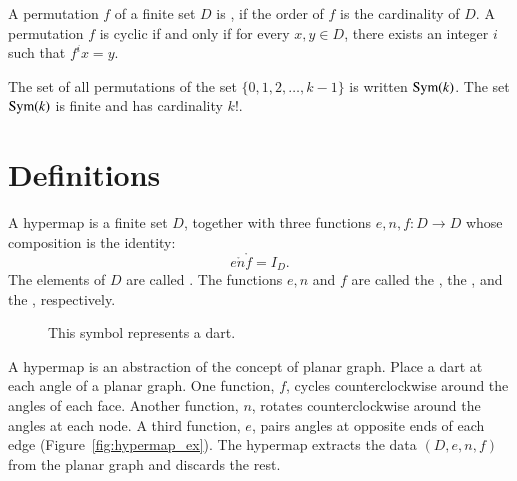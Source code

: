 A permutation $f$ of a finite set $D$ is , if the order of $f$ is the cardinality
of $D$.  A permutation $f$ is cyclic if and only if for every $x,y\in D$, there exists an integer $i$
such that $f^i x = y$.

The set of all permutations of the set $\{0,1,2,\ldots,k-1\}$ is written ${\operatorname{Sym}}(k)$.
The set ${\operatorname{Sym}}(k)$ is finite and has cardinality $k!$.



\section{Definitions}



\begin{definition}\label{def:hypermap}  
  A hypermap is a finite set $D$, together with three functions
  $e,n,f:D\to D$ whose composition is the identity:
  \begin{displaymath}
e\ocirc n\ocirc f = I_D.
\end{displaymath} The
elements of $D$ are called .  The functions $e,n$ and
$f$ are called the , the , and
the , respectively.  %
%
%
%
%
%
%
%
%
\end{definition}

\begin{figure}[htb]
\centering
{}
\caption{This symbol represents a dart.}
\label{fig:dart}
\end{figure}

\begin{remark}\label{rem:hypermap} A hypermap is an abstraction of
the concept of 
planar graph.  Place a dart at each angle of a planar graph.
One function, $f$, 
cycles counterclockwise around the angles of each face.  
Another function, $n$, 
rotates counterclockwise around the angles at each
node.  A third function, $e$, pairs angles at opposite ends of
each edge  (Figure~\ref{fig:hypermap_ex}).   The hypermap extracts
the data $(D,e,n,f)$ from the planar graph and discards the rest.
%
\end{remark}

